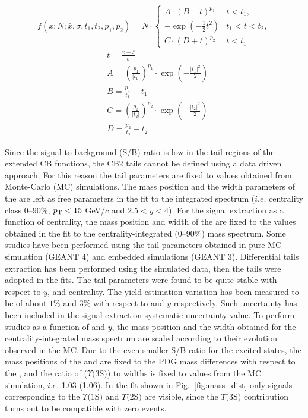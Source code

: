 \begin{equation}\label{eqn:CB2}
f(x;N;\bar{x},\sigma,t_1,t_2,p_1,p_2) = N\cdot\begin{cases} A\cdot(B-t)^{p_1} & t<t_1,\\ -\exp\left(-\frac{1}{2}t^2\right) & t_1<t<t_2,\\C\cdot(D+t)^{p_2} & t<t_1\end{cases}
\end{equation}
\begin{equation}\label{eqn:CB2def}
\begin{aligned}
&t=\frac{x-\bar{x}}{\sigma}
\\&A=\left(\frac{p_1}{|t_1|}\right)^{p_1}\cdot\exp\left(-\frac{|t_1|^2}{2}\right)
\\&B=\frac{p_1}{t_1} - t_1
\\&C=\left(\frac{p_2}{|t_2|}\right)^{p_2}\cdot\exp\left(-\frac{|t_2|^2}{2}\right)
\\&D=\frac{p_2}{t_2} - t_2
\end{aligned}
\end{equation}

Since the signal-to-background (S/B) ratio is low in the tail regions of the extended CB functions, the CB2 tails cannot be defined using a data driven approach.
For this reason the tail parameters are fixed to values obtained from Monte-Carlo (MC) simulations. 
The mass position and the width parameters of the \upsis are left as free parameters in the fit to the integrated spectrum ($i.e.$ centrality class 0--90\%, $p_{\rm T}<15$ GeV/$c$ and $2.5 < y < 4$).
For the signal extraction as a function of centrality, the mass position  and width of the \upsis are fixed to the values obtained in the fit to the centrality-integrated (0--90\%) mass spectrum.
Some studies have been performed using the tail parameters obtained in pure MC simulation (GEANT 4) and embedded simulations (GEANT 3).
Differential tails extraction has been performed using the simulated data, then the tails were adopted in the fits.
The tail parameters were found to be quite stable with respect to $y$, \pt and centrality.
The yield estimation variation has been measured to be of about $1\%$ and $3\%$ with respect to \pt and $y$ respectively.
Such uncertainty has been included in the signal extraction systematic uncertainty value.
To perform studies as a function of \pt and $y$, the mass position and the width obtained for the centrality-integrated mass spectrum are scaled according to their evolution observed in the MC.
Due to the even smaller S/B ratio for the excited states, the mass positions of the \upsiss and \upsisss are fixed to the PDG \cite{Patrignani:2016xqp} mass differences with respect to the \upsis, and the ratio of \upsiss ($\Upsilon\text{(3S)}$) to \upsis widths is fixed to values from the MC simulation, $i.e.$ 1.03 (1.06). 
In the fit shown in Fig.~\ref{fig:mass_dist} only signals corresponding to the $\Upsilon\text{(1S)}$ and $\Upsilon\text{(2S)}$ are visible, since the $\Upsilon\text{(3S)}$ contribution turns out to be compatible with zero events.
 

